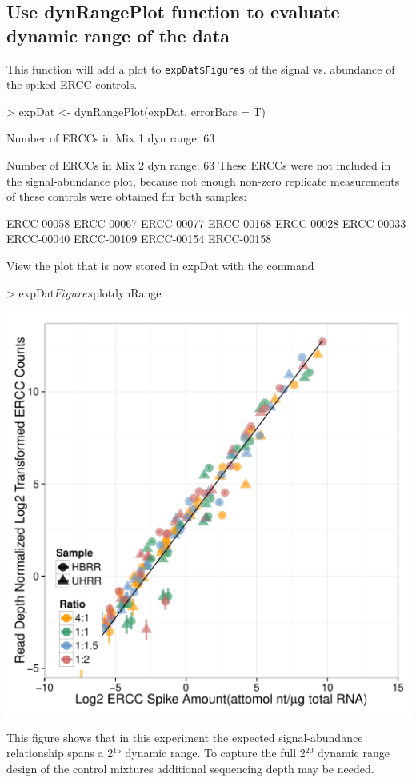 \documentclass{article}
\begin{document}
\subsection{Use dynRangePlot function to evaluate dynamic range of the data}
This function will add a plot to \verb|expDat$Figures|
of the signal vs. abundance of the spiked ERCC controls.
\begin{center}
\begin{Schunk}
\begin{Sinput}
> expDat <- dynRangePlot(expDat, errorBars = T)
\end{Sinput}
\begin{Soutput}
Number of ERCCs in Mix 1 dyn range:  63 

Number of ERCCs in Mix 2 dyn range:  63 
These ERCCs were not included in the signal-abundance plot,
because not enough non-zero replicate measurements of these 
controls were obtained for both samples:

ERCC-00058
ERCC-00067
ERCC-00077
ERCC-00168
ERCC-00028
ERCC-00033
ERCC-00040
ERCC-00109
ERCC-00154
ERCC-00158
\end{Soutput}
\end{Schunk}
\end{center}
View the plot that is now stored in expDat with the command
\clearpage
\begin{center}
\begin{Schunk}
\begin{Sinput}
> expDat$Figures$plotdynRange
\end{Sinput}
\end{Schunk}
\includegraphics{erccdashboardVignette-printPanelD}
\end{center}
This figure shows that in this experiment the expected signal-abundance
relationship spans a 2$^{15}$ dynamic range. To capture the full 2$^{20}$ dynamic 
range design of the control mixtures additional sequencing depth may be needed.
\end{document}
